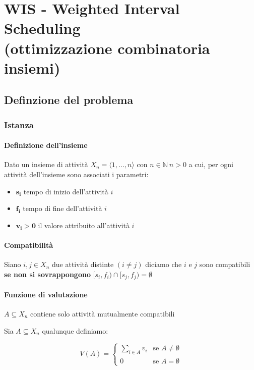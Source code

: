 \chapter{WIS - Weighted Interval Scheduling 
\\(ottimizzazione combinatoria insiemi)}

\section{Definzione del problema}
\subsection{Istanza}
\subsubsection{Definizione dell'insieme}
Dato un insieme di attività $X_n = \langle 1, \dots, n \rangle$ con $n \in \mathbb{N}\ n>0$ a cui, per ogni attività dell'insieme sono associati i parametri:
\begin{itemize}
    \item $\mathbf{s_i}$ tempo di inizio dell'attività $i$
    \item $\mathbf{f_i}$ tempo di fine dell'attività $i$
    \item $\mathbf{v_i >0}$ il valore attribuito all'attività $i$
\end{itemize}

\subsubsection{Compatibilità}
Siano $i,j \in X_n$ due attività distinte $(i \not = j)$ diciamo che $i$ e $j$ sono compatibili \textbf{se non si sovrappongono} \uline{$[s_i,f_i) \cap [s_j,f_j) = \emptyset$}

\subsubsection{Funzione di valutazione}
$A \subseteq X_n$ contiene solo attività mutualmente compatibili

Sia $A \subseteq X_n$ qualunque definiamo:

{
    \large
    $$
    V(A) = 
    \begin{cases}
        \sum_{i \in A} v_i & \text{se } A \neq \emptyset \\
        0 & \text{se } A = \emptyset
    \end{cases}
    $$
}

